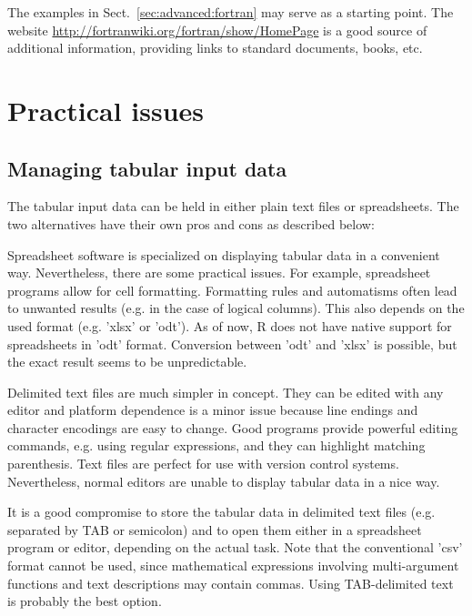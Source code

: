 \documentclass[times,onecolumn]{article}
\begin{document}
The examples in Sect.~\ref{sec:advanced:fortran} may serve as a starting point. The website \url{http://fortranwiki.org/fortran/show/HomePage} is a good source of additional information, providing links to standard documents, books, etc.


\section{Practical issues} \label{sec:practical}

\subsection{Managing tabular input data}

The tabular input data can be held in either plain text files or spreadsheets. The two alternatives have their own pros and cons as described below:

Spreadsheet software is specialized on displaying tabular data in a convenient way. Nevertheless, there are some practical issues. For example, spreadsheet programs allow for cell formatting. Formatting rules and automatisms often lead to unwanted results (e.g. in the case of logical columns). This also depends on the used format (e.g. 'xlsx' or 'odt'). As of now, R does not have native support for spreadsheets in 'odt' format. Conversion between 'odt' and 'xlsx' is possible, but the exact result seems to be unpredictable.

Delimited text files are much simpler in concept. They can be edited with any editor and platform dependence is a minor issue because line endings and character encodings are easy to change. Good programs provide powerful editing commands, e.g. using regular expressions, and they can highlight matching parenthesis. Text files are perfect for use with version control systems. Nevertheless, normal editors are unable to display tabular data in a nice way.

It is a good compromise to store the tabular data in delimited text files (e.g. separated by TAB or semicolon) and to open them either in a spreadsheet program or editor, depending on the actual task. Note that the conventional 'csv' format cannot be used, since mathematical expressions involving multi-argument functions and text descriptions may contain commas. Using TAB-delimited text is probably the best option.
\end{document}
